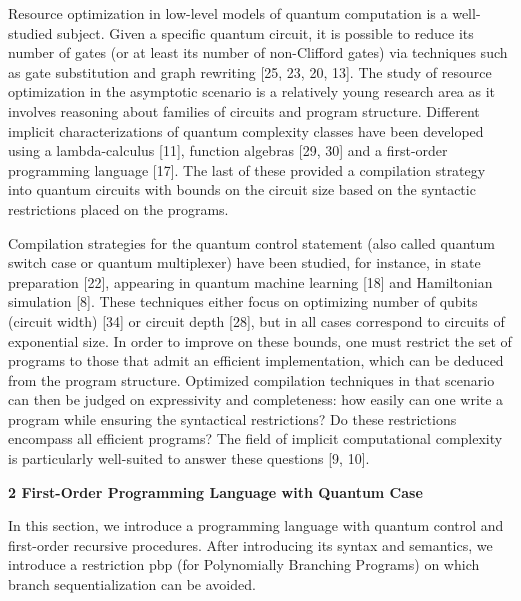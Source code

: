 Resource optimization in low-level models of quantum computation is a well-studied subject. Given a specific quantum circuit, it is possible to reduce its number of gates (or at least its number of non-Clifford gates) via techniques such as gate substitution and graph rewriting [25, 23, 20, 13]. The study of resource optimization in the asymptotic scenario is a relatively young research area as it involves reasoning about families of circuits and program structure. Different implicit characterizations of quantum complexity classes have been developed using a lambda-calculus [11], function algebras [29, 30] and a first-order programming language [17]. The last of these provided a compilation strategy into quantum circuits with bounds on the circuit size based on the syntactic restrictions placed on the programs.\par
 
 
 
Compilation strategies for the quantum control statement (also called quantum switch case or quantum multiplexer) have been studied, for instance, in state preparation [22], appearing in quantum machine learning [18] and Hamiltonian simulation [8]. These techniques either focus on optimizing number of qubits (circuit width) [34] or circuit depth [28], but in all cases correspond to circuits of exponential size. In order to improve on these bounds, one must restrict the set of programs to those that admit an efficient implementation, which can be deduced from the program structure. Optimized compilation techniques in that scenario can then be judged on expressivity and completeness: how easily can one write a program while ensuring the syntactical restrictions? Do these restrictions encompass all efficient programs? The field of implicit computational complexity is particularly well-suited to answer these questions [9, 10].\par
 
 
 


 
\par\medskip\noindent\textbf{2 First-Order Programming Language with Quantum Case}\par
 
 
In this section, we introduce a programming language with quantum control and first-order recursive procedures. After introducing its syntax and semantics, we introduce a restriction pbp (for Polynomially Branching Programs) on which branch sequentialization can be avoided.\par
 
